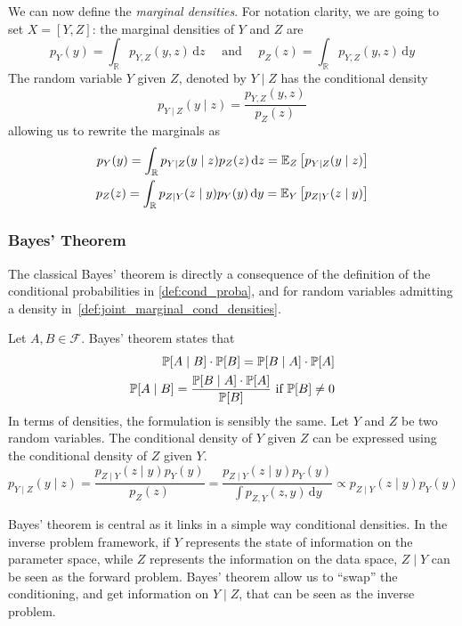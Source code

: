 \documentclass[../../Main_ManuscritThese.tex]{subfiles}
\begin{document}
\begin{definition}
  We can now define the \emph{marginal densities}.
  For notation clarity, we are going to set $X = [Y,Z]$: the marginal densities of $Y$ and $Z$ are
  \begin{equation}
    \label{eq:marginals_def}
    p_{Y}(y) = \int_{\mathbb{R}}p_{Y,Z}(y,z) \,\mathrm{d}z \quad \text{ and } \quad p_{Z}(z) = \int_{\mathbb{R}}p_{Y,Z}(y,z) \,\mathrm{d}y
  \end{equation}
  The random variable $Y$ given $Z$, denoted by $Y \mid Z$ has the conditional density
  \begin{equation}
    p_{Y \mid Z}(y \mid z) = \frac{p_{Y,Z}(y,z)}{p_Z(z)}
  \end{equation}
  allowing us to rewrite the marginals as
  \begin{align}
    \label{eq:marginal_conditioned}
        p_{Y}(y) = \int_{\mathbb{R}}p_{Y\mid Z}(y\mid z)p_Z(z) \,\mathrm{d}z=\mathbb{E}_Z\left[p_{Y\mid Z}(y\mid z)\right] \\ p_{Z}(z) = \int_{\mathbb{R}}p_{Z\mid Y}(z\mid y)p_Y(y) \,\mathrm{d}y = \mathbb{E}_{Y}\left[p_{Z\mid Y}(z\mid y)\right]
  \end{align}

\end{definition}

\subsubsection{Bayes' Theorem}
\label{ssec:bayes_theorem}

The classical Bayes' theorem is directly a consequence of the
definition of the conditional probabilities in \cref{def:cond_proba},
and for random variables admitting a density
in~\cref{def:joint_marginal_cond_densities}.

\begin{theorem}
  Let $A, B\in\mathcal{F}$. Bayes' theorem states that
  \begin{align*}
    \mathbb{P}[A\mid B]\cdot \mathbb{P}[B] = \mathbb{P}[B \mid A]\cdot\mathbb{P}[A] \\
    \mathbb{P}[A \mid B] = \frac{\mathbb{P}[B \mid A]\cdot\mathbb{P}[A]}{\mathbb{P}[B]} \text{ if } \mathbb{P}[B] \neq 0
  \end{align*}
 In terms of densities, the formulation is sensibly the same.
  Let $Y$ and $Z$ be two random variables. The conditional density of $Y$ given $Z$ can be expressed using the conditional density of $Z$ given $Y$.
  \begin{equation}
    p_{Y\mid Z}(y \mid z) = \frac{p_{Z\mid Y}(z\mid y) p_Y(y)}{p_Z(z)} = \frac{p_{Z\mid Y}(z\mid y) p_Y(y)}{\int p_{Z,Y}(z,y) \,\mathrm{d}y}  \propto p_{Z\mid Y}(z\mid y) p_Y(y)
  \end{equation}
\end{theorem}
Bayes' theorem is central as it links in a simple way conditional
densities. In the inverse problem framework, if $Y$ represents the
state of information on the parameter space, while $Z$ represents the
information on the data space, $Z\mid Y$ can be seen as the forward
problem. Bayes' theorem allow us to ``swap'' the conditioning, and get
information on $Y\mid Z$, that can be seen as the inverse problem.
\end{document}
